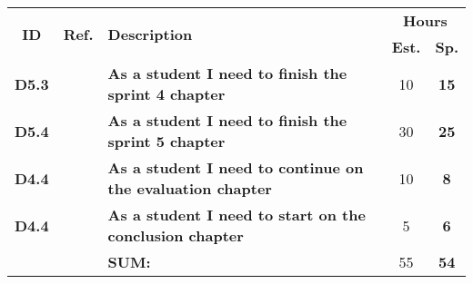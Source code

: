   \label{tab:sprint5Documentationstories}
 \def\arraystretch{1.25}
 
\begin{longtable}{ccXcc}

\toprule[0.5mm]
\multirow{2}{*}{\textbf{ID}} &
\multirow{2}{*}{\textbf{Ref.}} & \multirow{2}{*}{\textbf{Description}} & \multicolumn{2}{c}{\textbf{Hours}} \\
 					& & & \textbf{Est.} & \textbf{Sp.} \\
\midrule

	
\textbf{D5.3} 	&	& {\bf As a student I need to finish the sprint 4 chapter} 					&   10  & \textbf{15} \\

\textbf{D5.4} 	&	& {\bf As a student I need to finish the sprint 5 chapter} 					& 	30 	& \textbf{25} \\

\textbf{D4.4} 	&	& {\bf As a student I need to continue on the evaluation chapter} 			& 	10 	& \textbf{8} \\

\textbf{D4.4} 	&	& {\bf As a student I need to start on the conclusion chapter} 				& 	5 	& \textbf{6} \\


\midrule
		
				&	& \textbf{SUM:}		&		55	& \textbf{54}
 \\																			
\bottomrule[0.5mm]
\end{longtable}
